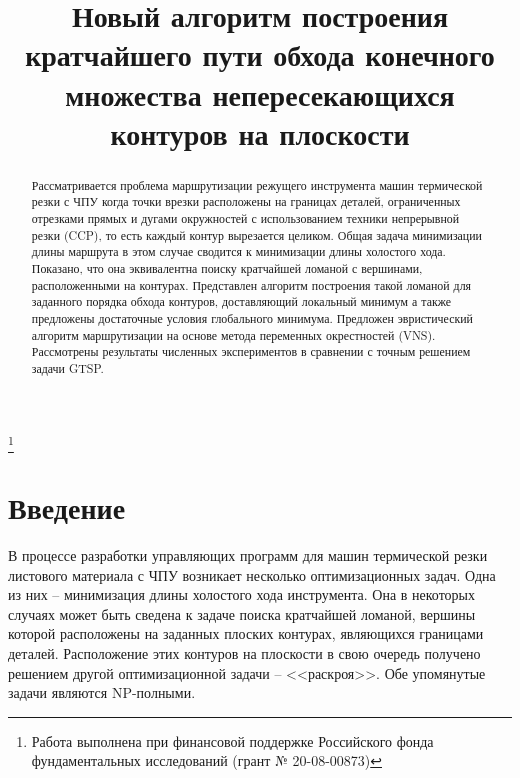 \documentclass[12pt]{a&t}
\begin{document}
\title{
  Новый алгоритм построения кратчайшего пути обхода
  конечного множества непересекающихся контуров на плоскости
}%
\thanks{
  Работа выполнена при финансовой поддержке
  Российского фонда фундаментальных исследований
  (грант № 20-08-00873)
}


\maketitle

\begin{abstract}
Рассматривается проблема маршрутизации режущего
инструмента машин термической резки с ЧПУ
когда точки врезки расположены
на границах деталей,
ограниченных отрезками прямых и дугами окружностей
с использованием техники непрерывной резки
(CCP),
то есть каждый контур вырезается целиком.
Общая задача минимизации длины маршрута
в этом случае сводится к минимизации длины холостого хода.
Показано, что она эквивалентна поиску
кратчайшей ломаной с вершинами,
расположенными на контурах.
Представлен алгоритм построения
такой ломаной для заданного порядка
обхода контуров,
доставляющий локальный минимум
а также предложены достаточные условия
глобального минимума.
Предложен эвристический алгоритм
маршрутизации на основе
метода переменных окрестностей
(VNS).
Рассмотрены результаты численных экспериментов
в сравнении с точным решением задачи GTSP.
\end{abstract}

\section{Введение}

В процессе разработки управляющих программ
для машин термической резки листового материала с ЧПУ
возникает несколько оптимизационных задач.
Одна из них -- минимизация
длины холостого хода инструмента.
Она в некоторых случаях может быть сведена
к задаче поиска кратчайшей ломаной,
вершины которой расположены на заданных
плоских контурах,
являющихся границами деталей.
Расположение этих контуров на плоскости
в свою очередь получено решением другой
оптимизационной задачи -- <<раскроя>>.
Обе упомянутые задачи являются NP-полными.
\end{document}

